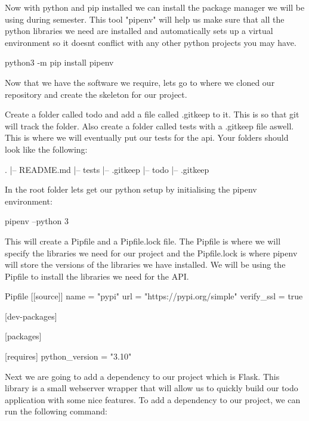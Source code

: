 \documentclass{csse4400}
\begin{document}
Now with python and pip installed we can install the package manager we will be using during semester. This tool "pipenv" will help us make sure that all the python libraries we need are installed and automatically sets up a virtual environment so it doesnt conflict with any other python projects you may have.

\begin{code}[language=bash]{}
python3 -m pip install pipenv
\end{code}

Now that we have the software we require, lets go to where we cloned our repository and create the skeleton for our project.

Create a folder called todo and add a file called .gitkeep to it. This is so that git will track the folder. Also create a folder called tests with a .gitkeep file aswell. This is where we will eventually put our tests for the api. Your folders should look like the following:

\begin{code}[language=bash]{}
  .
  |-- README.md
  |-- tests
      |-- .gitkeep
  |-- todo
      |-- .gitkeep
\end{code}

In the root folder lets get our python setup by initialising the pipenv environment:

\begin{code}[language=bash]{}
pipenv --python 3
\end{code}

This will create a Pipfile and a Pipfile.lock file. The Pipfile is where we will specify the libraries we need for our project and the Pipfile.lock is where pipenv will store the versions of the libraries we have installed. We will be using the Pipfile to install the libraries we need for the API.

\begin{code}{Pipfile}
[[source]]
name = "pypi"
url = "https://pypi.org/simple"
verify_ssl = true

[dev-packages]

[packages]

[requires]
python_version = "3.10"
\end{code}


Next we are going to add a dependency to our project which is Flask. This library is a small webserver wrapper that will allow us to quickly build our todo application with some nice features. To add a dependency to our project, we can run the following command:
\end{document}
